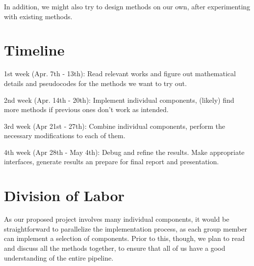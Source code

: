 \documentclass[acmtog, table, dvipsnames]{acmart}
\begin{document}
In addition, we might also try to design methods on our own, after experimenting with existing methods.
%
\section{Timeline}
1st week (Apr. 7th - 13th): Read relevant works and figure out mathematical details and pseudocodes for the methods we want to try out.

2nd week (Apr. 14th - 20th): Implement individual components, (likely) find more methods if previous ones don't work as intended.

3rd week (Apr 21st - 27th): Combine individual components, perform the necessary modifications to each of them.

4th week (Apr 28th - May 4th): Debug and refine the results. Make appropriate interfaces, generate results an prepare for final report and presentation.

\section{Division of Labor}
As our proposed project involves many individual components, it would be straightforward to parallelize the implementation process, as each group member can implement a selection of components. Prior to this, though, we plan to read and discuss all the methods together, to ensure that all of us have a good understanding of the entire pipeline.
%
%
%
\end{document}
